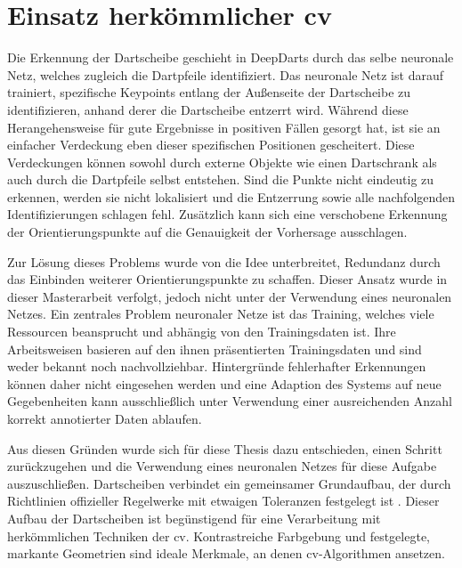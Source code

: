 

\section{Einsatz herkömmlicher \acl{cv}}
\label{sec:einsatz_cv}

Die Erkennung der Dartscheibe geschieht in DeepDarts durch das selbe neuronale Netz, welches zugleich die Dartpfeile identifiziert. Das neuronale Netz ist darauf trainiert, spezifische Keypoints entlang der Außenseite der Dartscheibe zu identifizieren, anhand derer die Dartscheibe entzerrt wird. Während diese Herangehensweise für gute Ergebnisse in positiven Fällen gesorgt hat, ist sie an einfacher Verdeckung eben dieser spezifischen Positionen gescheitert. Diese Verdeckungen können sowohl durch externe Objekte wie einen Dartschrank als auch durch die Dartpfeile selbst entstehen. Sind die Punkte nicht eindeutig zu erkennen, werden sie nicht lokalisiert und die Entzerrung sowie alle nachfolgenden Identifizierungen schlagen fehl. Zusätzlich kann sich eine verschobene Erkennung der Orientierungspunkte auf die Genauigkeit der Vorhersage ausschlagen.

Zur Lösung dieses Problems wurde von \citeauthor{deepdarts} die Idee unterbreitet, Redundanz durch das Einbinden weiterer Orientierungspunkte zu schaffen. Dieser Ansatz wurde in dieser Masterarbeit verfolgt, jedoch nicht unter der Verwendung eines neuronalen Netzes. Ein zentrales Problem neuronaler Netze ist das Training, welches viele Ressourcen beansprucht und abhängig von den Trainingsdaten ist. Ihre Arbeitsweisen basieren auf den ihnen präsentierten Trainingsdaten und sind weder bekannt noch nachvollziehbar. Hintergründe fehlerhafter Erkennungen können daher nicht eingesehen werden und eine Adaption des Systems auf neue Gegebenheiten kann ausschließlich unter Verwendung einer ausreichenden Anzahl korrekt annotierter Daten ablaufen.

Aus diesen Gründen wurde sich für diese Thesis dazu entschieden, einen Schritt zurückzugehen und die Verwendung eines neuronalen Netzes für diese Aufgabe auszuschließen. Dartscheiben verbindet ein gemeinsamer Grundaufbau, der durch Richtlinien offizieller Regelwerke mit etwaigen Toleranzen festgelegt ist \cite{wdf-rules,pdc_rules}. Dieser Aufbau der Dartscheiben ist begünstigend für eine Verarbeitung mit herkömmlichen Techniken der \ac{cv}. Kontrastreiche Farbgebung und festgelegte, markante Geometrien sind ideale Merkmale, an denen \ac{cv}-Algorithmen ansetzen.

